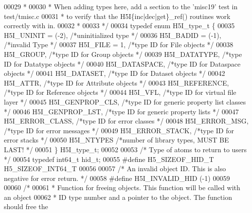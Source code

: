 \begin{DoxyCode}
00029 \textcolor{comment}{ *}
00030 \textcolor{comment}{ * When adding types here, add a section to the 'misc19' test in test/tmisc.c}
00031 \textcolor{comment}{ * to verify that the H5I\{inc|dec|get\}\_ref() routines work correctly with in.}
00032 \textcolor{comment}{ *}
00033 \textcolor{comment}{ */}
00034 \textcolor{keyword}{typedef} \textcolor{keyword}{enum} H5I\_type\_t \{
00035     H5I\_UNINIT      = (-2), \textcolor{comment}{/*uninitialized type                */}
00036     H5I\_BADID       = (-1), \textcolor{comment}{/*invalid Type                  */}
00037     H5I\_FILE            = 1,    \textcolor{comment}{/*type ID for File objects              */}
00038     H5I\_GROUP,                  \textcolor{comment}{/*type ID for Group objects             */}
00039     H5I\_DATATYPE,           \textcolor{comment}{/*type ID for Datatype objects          */}
00040     H5I\_DATASPACE,          \textcolor{comment}{/*type ID for Dataspace objects         */}
00041     H5I\_DATASET,            \textcolor{comment}{/*type ID for Dataset objects           */}
00042     H5I\_ATTR,               \textcolor{comment}{/*type ID for Attribute objects         */}
00043     H5I\_REFERENCE,          \textcolor{comment}{/*type ID for Reference objects         */}
00044     H5I\_VFL,            \textcolor{comment}{/*type ID for virtual file layer        */}
00045     H5I\_GENPROP\_CLS,            \textcolor{comment}{/*type ID for generic property list classes */}
00046     H5I\_GENPROP\_LST,            \textcolor{comment}{/*type ID for generic property lists        */}
00047     H5I\_ERROR\_CLASS,            \textcolor{comment}{/*type ID for error classes         */}
00048     H5I\_ERROR\_MSG,              \textcolor{comment}{/*type ID for error messages            */}
00049     H5I\_ERROR\_STACK,            \textcolor{comment}{/*type ID for error stacks          */}
00050     H5I\_NTYPES              \textcolor{comment}{/*number of library types, MUST BE LAST!    */}
00051 \} H5I\_type\_t;
00052 
00053 \textcolor{comment}{/* Type of atoms to return to users */}
00054 \textcolor{keyword}{typedef} int64\_t hid\_t;
00055 \textcolor{preprocessor}{#define H5\_SIZEOF\_HID\_T         H5\_SIZEOF\_INT64\_T}
00056 
00057 \textcolor{comment}{/* An invalid object ID. This is also negative for error return. */}
00058 \textcolor{preprocessor}{#define H5I\_INVALID\_HID         (-1)}
00059 
00060 \textcolor{comment}{/*}
00061 \textcolor{comment}{ * Function for freeing objects. This function will be called with an object}
00062 \textcolor{comment}{ * ID type number and a pointer to the object. The function should free the}

\end{DoxyCode}
